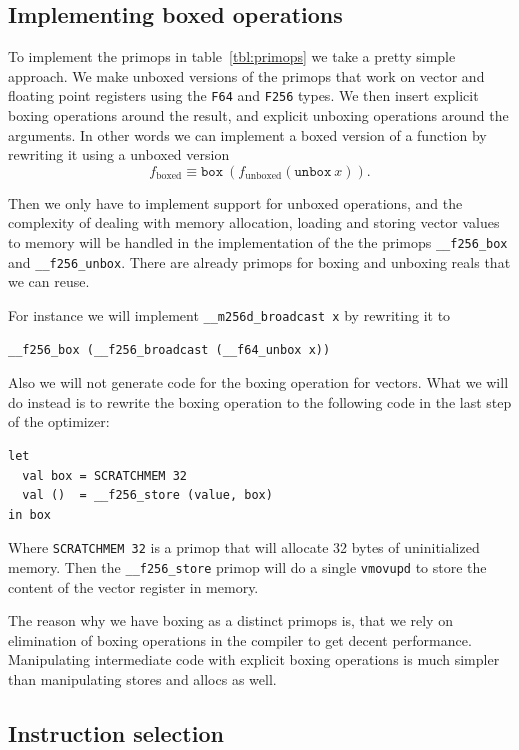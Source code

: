 \documentclass{article}
\begin{document}
\subsection{Implementing boxed operations}

To implement the primops in table~\ref{tbl:primops} we take a pretty simple approach. We make unboxed versions of the primops that work on vector and floating point registers using the \texttt{F64} and \texttt{F256} types. We then insert explicit boxing operations around the result, and explicit unboxing operations around the arguments. In other words we can implement a boxed version of a function by rewriting it using a unboxed version
\[
    f_{\mathrm{boxed}} \equiv \mathtt{box}\ (f_{\mathrm{unboxed}} (\mathtt{unbox}\ x)).
\]

Then we only have to implement support for unboxed operations, and the complexity of dealing with memory allocation, loading and storing vector values to memory will be handled in the implementation of the the primops \verb!__f256_box! and \verb!__f256_unbox!. There are already primops for boxing and unboxing reals that we can reuse.

For instance we will implement \verb!__m256d_broadcast x! by rewriting it to
\begin{verbatim}
__f256_box (__f256_broadcast (__f64_unbox x))
\end{verbatim}

Also we will not generate code for the boxing operation for vectors. What we will do instead is to rewrite the boxing operation to the following code in the last step of the optimizer:
\begin{verbatim}
let
  val box = SCRATCHMEM 32
  val ()  = __f256_store (value, box)
in box
\end{verbatim}
Where \verb!SCRATCHMEM 32! is a primop that will allocate 32 bytes of uninitialized memory. Then the \verb!__f256_store! primop will do a single \verb!vmovupd! to store the content of the vector register in memory.

The reason why we have boxing as a distinct primops is, that we rely on elimination of boxing operations in the compiler to get decent performance. Manipulating intermediate code with explicit boxing operations is much simpler than manipulating stores and allocs as well.

\subsection{Instruction selection}
\end{document}
